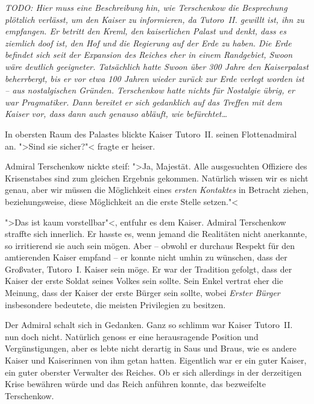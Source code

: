 \mbox{}

{\sffamily\slshape\large TODO: Hier muss eine Beschreibung hin, wie Terschenkow die Besprechung plötzlich verlässt, um den Kaiser zu informieren, da Tutoro~II. gewillt ist, ihn zu empfangen. Er betritt den Kreml, den kaiserlichen Palast und denkt, dass es ziemlich doof ist, den Hof und die Regierung auf der Erde zu haben. Die Erde befindet sich seit der Expansion des Reiches eher in einem Randgebiet, Swoon wäre deutlich geeigneter. Tatsächlich hatte Swoon über 300 Jahre den Kaiserpalast beherrbergt, bis er vor etwa 100 Jahren wieder zurück zur Erde verlegt worden ist -- aus nostalgischen Gründen. Terschenkow hatte nichts für Nostalgie übrig, er war Pragmatiker. Dann bereitet er sich gedanklich auf das Treffen mit dem Kaiser vor, dass dann auch genauso abläuft, wie befürchtet\dots}

In obersten Raum des Palastes blickte Kaiser Tutoro~II. seinen Flottenadmiral an. ">Sind sie sicher?"< fragte er heiser.

Admiral Terschenkow nickte steif: ">Ja, Majestät. Alle ausgesuchten Offiziere des Krisenstabes sind zum gleichen Ergebnis gekommen. Natürlich wissen wir es nicht genau, aber wir müssen die Möglichkeit eines \emph{ersten Kontaktes} in Betracht ziehen, beziehungsweise, diese Möglichkeit an die erste Stelle setzen."<

">Das ist kaum vorstellbar"<, entfuhr es dem Kaiser. Admiral Terschenkow straffte sich innerlich. Er hasste es, wenn jemand die Realitäten nicht anerkannte, so irritierend sie auch sein mögen. Aber -- obwohl er durchaus Respekt für den amtierenden Kaiser empfand -- er konnte nicht umhin zu wünschen, dass der Großvater, Tutoro~I. Kaiser sein möge. Er war der Tradition gefolgt, dass der Kaiser der erste Soldat seines Volkes sein sollte. Sein Enkel vertrat eher die Meinung, dass der Kaiser der erste Bürger sein sollte, wobei \emph{Erster Bürger} insbesondere bedeutete, die meisten Privilegien zu besitzen.

Der Admiral schalt sich in Gedanken. Ganz so schlimm war Kaiser Tutoro~II. nun doch nicht. Natürlich genoss er eine herausragende Position und Vergünstigungen, aber es lebte nicht derartig in Saus und Braus, wie es andere Kaiser und Kaiserinnen von ihm getan hatten. Eigentlich war er ein guter Kaiser, ein guter oberster Verwalter des Reiches. Ob er sich allerdings in der derzeitigen Krise bewähren würde und das Reich anführen konnte, das bezweifelte Terschenkow.

